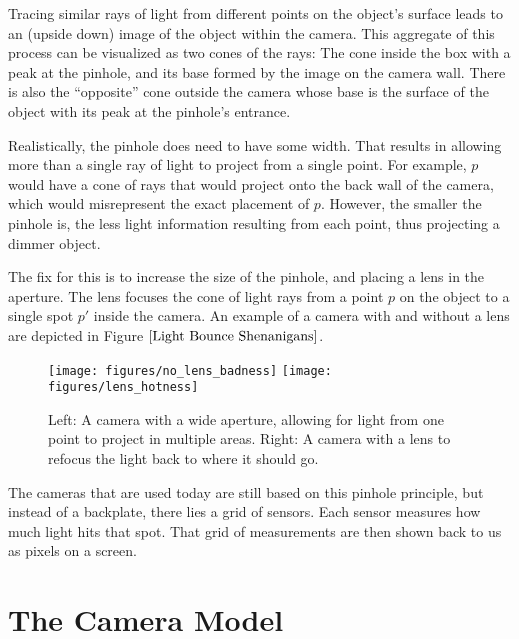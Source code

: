 \documentclass[
    12pt,
    twoside,
    bibstyle=chicago,
    headerstyle=uppercase,
	bibfile=biblatex_updating.bib
]{reedthesis}
\begin{document}
Tracing similar rays of light from different points on the object's surface leads to an (upside down) image of the object within the camera. This aggregate of this process can be visualized as two cones of the rays: The cone inside the box with a peak at the pinhole, and its base formed by the image on the camera wall. There is also the ``opposite'' cone outside the camera whose base is the surface of the object with its peak at the pinhole's entrance.

Realistically, the pinhole does need to have some width. That results in allowing more than a single ray of light to project from a single point. For example, $p$ would have a cone of rays that would project onto the back wall of the camera, which would misrepresent the exact placement of $p$. However, the smaller the pinhole is, the less light information resulting from each point, thus projecting a dimmer object.

The fix for this is to increase the size of the pinhole, and placing a lens in the aperture. The lens focuses the cone of light rays from a point $p$ on the object to a single spot $p'$ inside the camera. An example of a camera with and without a lens are depicted in Figure $\ref{Light Bounce Shenanigans}$. 



\begin{figure}[t]
	    \centering
	    \texttt{[image: figures/no\_lens\_badness]}
		\hfill
		\texttt{[image: figures/lens\_hotness]}
	    \caption{Left: A camera with a wide aperture, allowing for light from one point to project in multiple areas. Right: A camera with a lens to refocus the light back to where it should go.}
	\label{Light Bounce Shenanigans}
	\end{figure}


The cameras that are used today are still based on this pinhole principle, but instead of a backplate, there lies a grid of sensors. Each sensor measures how much light hits that spot. That grid of measurements are then shown back to us as pixels on a screen.


\section{The Camera Model}
\end{document}
